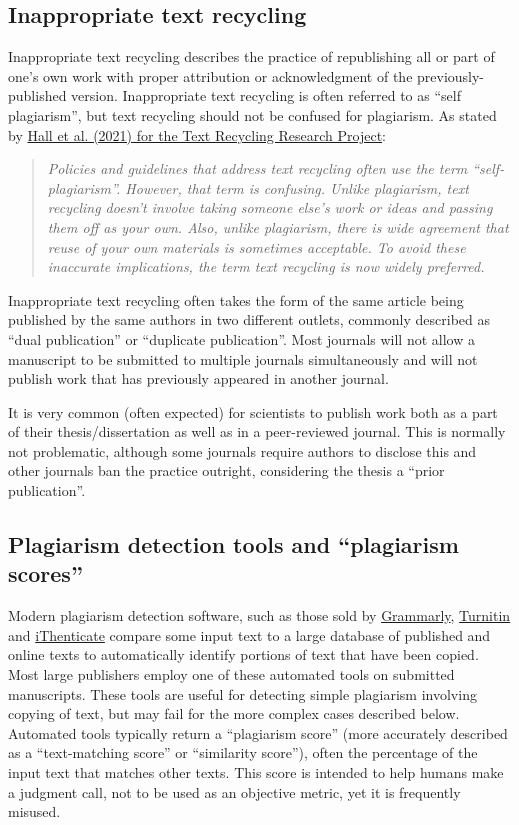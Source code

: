 \documentclass[letterpaper, 12pt]{article}
\begin{document}
\subsection*{Inappropriate text recycling}

Inappropriate text recycling describes the practice of republishing all or part of one's own work with proper attribution or acknowledgment of the previously-published version. Inappropriate text recycling is often referred to as ``self plagiarism'', but text recycling should not be confused for plagiarism. As stated by \href{https://textrecycling.org/files/2021/06/Understanding-Text-Recycling_A-Guide-for-Researchers-V.1.pdf}{Hall et al. (2021) for the Text Recycling Research Project}:


\begin{quote}
    \textit{Policies and guidelines that address text recycling often use the term ``self-plagiarism''. However, that term is confusing. Unlike plagiarism, text recycling doesn’t involve taking someone else's work or ideas and passing them off as your own. Also, unlike plagiarism, there is wide agreement that reuse of your own materials is sometimes acceptable. To avoid these inaccurate implications, the term text recycling is now widely preferred.}
\end{quote}

Inappropriate text recycling often takes the form of the same article being published by the same authors in two different outlets, commonly described as ``dual publication'' or ``duplicate publication''. Most journals will not allow a manuscript to be submitted to multiple journals simultaneously and will not publish work that has previously appeared in another journal.

It is very common (often expected) for scientists to publish work both as a part of their thesis/dissertation as well as in a peer-reviewed journal. This is normally not problematic, although some journals require authors to disclose this and other journals ban the practice outright, considering the thesis a ``prior publication''. 

\subsection*{Plagiarism detection tools and ``plagiarism scores''}

Modern plagiarism detection software, such as those sold by \href{https://www.grammarly.com/plagiarism-checker}{Grammarly}, \href{https://www.turnitin.com/}{Turnitin} and \href{https://www.ithenticate.com/}{iThenticate} compare some input text to a large database of published and online texts to automatically identify portions of text that have been copied. Most large publishers employ one of these automated tools on submitted manuscripts. These tools are useful for detecting simple plagiarism involving copying of text, but may fail for the more complex cases described below. Automated tools typically return a ``plagiarism score'' (more accurately described as a ``text-matching score'' or ``similarity score''), often the percentage of the input text that matches other texts. This score is intended to help humans make a judgment call, not to be used as an objective metric, yet it is frequently misused.
\end{document}
